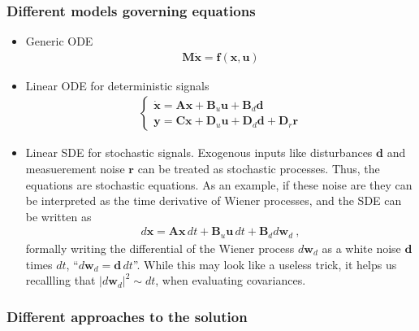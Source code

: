 \documentclass[letterpaper,10pt,english]{jupyterBook}
\begin{document}
\subsubsection*{Different models \sphinxhyphen{} governing equations}
\begin{itemize}
\item {} 
\sphinxAtStartPar
Generic ODE
\begin{equation*}
\begin{split}\mathbf{M} \dot{\mathbf{x}} = \mathbf{f}(\mathbf{x}, \mathbf{u})\end{split}
\end{equation*}
\item {} 
\sphinxAtStartPar
Linear ODE for deterministic signals
\begin{equation*}
\begin{split}\begin{cases}
     \dot{\mathbf{x}} = \mathbf{A} \mathbf{x} + \mathbf{B}_u \mathbf{u} + \mathbf{B}_d \mathbf{d} \\
          \mathbf{y}  = \mathbf{C} \mathbf{x} + \mathbf{D}_u \mathbf{u} + \mathbf{D}_d \mathbf{d} + \mathbf{D}_r \mathbf{r}
   \end{cases}\end{split}
\end{equation*}
\item {} 
\sphinxAtStartPar
Linear SDE for stochastic signals. Exogenous inputs like disturbances \(\mathbf{d}\) and measuerement noise \(\mathbf{r}\) can be treated as stochastic processes. Thus, the equations are stochastic equations. As an example, if these noise are  they can be interpreted as the time derivative of Wiener processes, and the SDE can be written as
\begin{equation*}
\begin{split} d \mathbf{x} = \mathbf{A} \mathbf{x} \, dt + \mathbf{B}_u \mathbf{u} \, dt + \mathbf{B}_d d \mathbf{w}_d \ ,\end{split}
\end{equation*}
\sphinxAtStartPar
formally writing the differential of the Wiener process \(d \mathbf{w}_d\) as a white noise \(\mathbf{d}\) times \(dt\), “\(d \mathbf{w}_d = \mathbf{d} \, dt\)”. While this may look like a useless trick, it helps us recallling that \(| d \mathbf{w}_d |^2 \sim dt\), when evaluating covariances.

\end{itemize}
\subsubsection*{Different approaches to the solution}
\end{document}
